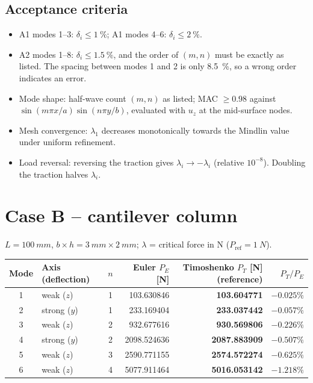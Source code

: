 \documentclass[11pt,a4paper]{report}
\newcommand{\refval}[1]{\textbf{#1}}
\begin{document}
\subsection*{Acceptance criteria}
\begin{itemize}
\item A1 modes 1--3: $\delta_i\le\SI{1}{\percent}$; A1 modes 4--6:
  $\delta_i\le\SI{2}{\percent}$.
\item A2 modes 1--8: $\delta_i\le\SI{1.5}{\percent}$, and the order of $(m,n)$
  must be exactly as listed. The spacing between modes 1 and 2 is only
  \SI{8.5}{\percent}, so a wrong order indicates an error.
\item Mode shape: half-wave count $(m,n)$ as listed; MAC $\ge 0.98$ against
  $\sin(m\pi x/a)\sin(n\pi y/b)$, evaluated with $u_z$ at the mid-surface
  nodes.
\item Mesh convergence: $\lambda_1$ decreases monotonically towards the
  Mindlin value under uniform refinement.
\item Load reversal: reversing the traction gives $\lambda_i\to-\lambda_i$
  (relative $10^{-8}$).
  Doubling the traction halves $\lambda_i$.
\end{itemize}

\section{Case B -- cantilever column}
$L=\SI{100}{mm}$, $b\times h=\SI{3}{mm}\times\SI{2}{mm}$; $\lambda$ = critical force in \si{N} ($P_\text{ref}=\SI{1}{N}$).
\begin{center}
\begin{tabular}{@{}clcrrr@{}}
\toprule
Mode & Axis (deflection) & $n$ & Euler $P_E$ [\si{N}] & \refval{Timoshenko $P_T$ [\si{N}] (reference)} & $P_T/P_E$ \\
\midrule
1 & weak ($z$) & 1 & 103.630846 & \refval{103.604771} & $-0.025\%$ \\
2 & strong ($y$) & 1 & 233.169404 & \refval{233.037442} & $-0.057\%$ \\
3 & weak ($z$) & 2 & 932.677616 & \refval{930.569806} & $-0.226\%$ \\
4 & strong ($y$) & 2 & 2098.524636 & \refval{2087.883909} & $-0.507\%$ \\
5 & weak ($z$) & 3 & 2590.771155 & \refval{2574.572274} & $-0.625\%$ \\
6 & weak ($z$) & 4 & 5077.911464 & \refval{5016.053142} & $-1.218\%$ \\
\bottomrule
\end{tabular}
\end{center}
\end{document}
